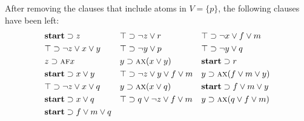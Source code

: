 \documentclass[runningheads]{llncs}
\newcommand{\start}{\textbf{start}}
\newcommand{\ALL}{\textsc{a}}
\newcommand{\NEXT}{\textsc{x}}
\newcommand{\FUTURE}{\textsc{f}}
\begin{document}
\begin{example}\label{examp:remA}
After removing the clauses that include atoms in $V=\{p\}$, the following clauses have been left:
\begin{align*}
& \start\supset z &&  \top \supset \neg z \vee r && \top \supset \neg x\vee f \vee m\\
&  \top \supset \neg z \vee x \vee y &&  \top \supset \neg y \vee p &&  \top \supset \neg y \vee q\\
&  z \supset \ALL \FUTURE x &&   y \supset \ALL \NEXT(x\vee y) && \start \supset r \\
& \start \supset x \vee y && \top \supset \neg z \vee y \vee f \vee m && y \supset \ALL\NEXT(f\vee m\vee y)\\
& \top \supset \neg z \vee x \vee q && y \supset \ALL\NEXT(x\vee q) &&  \start \supset f\vee m \vee y \\
& \start \supset x \vee q && \top \supset q \vee \neg z \vee f \vee m && y \supset \ALL\NEXT(q \vee f\vee m) \\
& \start \supset f\vee m \vee q
\end{align*}
\end{example}
\end{document}

